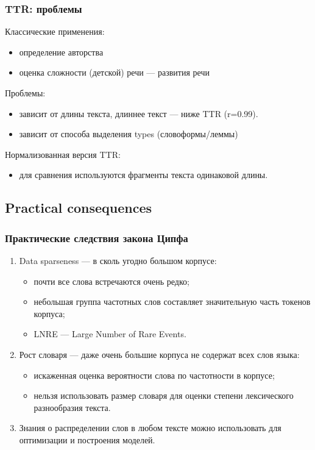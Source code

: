 \documentclass[svgnames]{beamer}
\begin{document}
\begin{frame}
  \frametitle{TTR: проблемы}
  Классические применения:
  \begin{itemize}
  \item определение авторства
  \item оценка сложности (детской) речи — развития речи
  \end{itemize}
  Проблемы:
  \begin{itemize}
  \item \alert{зависит от длины текста}, длиннее текст — ниже TTR (r=0.99).
  \item зависит от способа выделения types (словоформы/леммы)
  \end{itemize}
  Нормализованная версия TTR:
  \begin{itemize}
  \item для сравнения используются фрагменты текста одинаковой длины.
  \end{itemize}
\end{frame}

\subsection{Practical consequences}

\begin{frame}
  \frametitle{Практические следствия закона Ципфа}
  \begin{enumerate}
  \item \alert{Data sparseness} — в сколь угодно большом корпусе:
    \begin{itemize}
    \item почти все слова встречаются очень редко;
    \item небольшая группа частотных слов составляет значительную
      часть токенов корпуса;
    \item LNRE — Large Number of Rare Events. 
    \end{itemize}
  \item \alert{Рост словаря} — даже очень большие корпуса не содержат всех слов языка:
    \begin{itemize}
    \item искаженная оценка вероятности слова по частотности в корпусе;
    \item нельзя использовать размер словаря для оценки степени
      лексического разнообразия текста.
    \end{itemize}
  \item \alert{Знания о распределении} слов в любом тексте можно использовать
    для оптимизации и построения моделей.
  \end{enumerate}
\end{frame}
\end{document}
